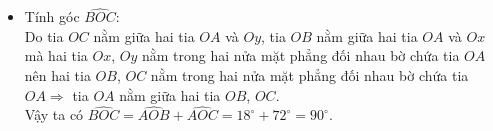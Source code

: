 \begin{vd}
{\begin{itemize}
			$\widehat{COy} = \dfrac{1}{2}\widehat{AOy}=\dfrac{1}{2} \cdot 144^\circ=72^\circ\Rightarrow \widehat{COy} < \widehat{AOy}$ (vì $72^\circ<144^\circ$)\\
			Mà $2$ tia $OA$, $OC$ cùng nằm trong nửa mặt phẳng bờ $xy\Rightarrow $ tia $OC$ nằm giữa hai tia $OA$ và $Oy$.\\
			Vậy, ta có $\widehat{AOC} + \widehat{CO y}=\widehat{AO y}$, suy ra $\widehat{AOC} + 72^{\circ}= 144^{\circ}\Rightarrow\widehat{AOC}= 72^{\circ}$.\hfill (2)
			\item Tính góc $\widehat{BOC}$: \\
			Do tia $OC$ nằm giữa hai tia $OA$ và $Oy$, tia $OB$ nằm giữa hai tia $OA$ và $Ox$ mà hai tia $Ox$, $Oy$ nằm trong hai nửa mặt phẳng đối nhau bờ chứa tia $OA$ nên hai tia $OB$, $OC$ nằm trong hai nửa mặt phẳng đối nhau bờ chứa tia $OA\Rightarrow $ tia $OA$ nằm giữa hai tia $OB$, $OC$.\\
			Vậy ta có $\widehat{BOC} = \widehat {AOB} + \widehat {AOC} =18^\circ+72^\circ=90^\circ$.
		\end{itemize}
	}
\end{vd}
